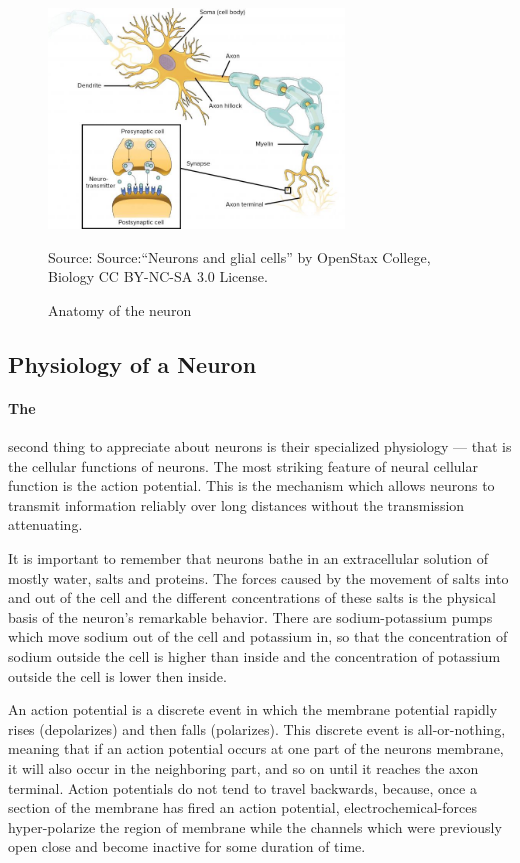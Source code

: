 \documentclass[paper=a4, fontsize=11pt]{scrartcl} %
\numberwithin{equation}{section} %
\numberwithin{figure}{section} %
\numberwithin{table}{section} %
\begin{document}
\begin{figure}[H]
    \centering
    \includegraphics[width=0.7\textwidth]{./data/neural.jpg}
    \caption{Anatomy of the neuron}
    \label{fig:my_picture}
    \vspace{1pt} %
    \small{Source: Source:“Neurons and glial cells” by OpenStax College, Biology CC BY-NC-SA 3.0 License.}
\end{figure}


\subsection{Physiology of a Neuron}
\paragraph{The}

 second thing to appreciate about neurons is their specialized physiology — that is the cellular functions of neurons. The most striking feature of neural cellular function is the action potential. This is the mechanism which allows neurons to transmit information reliably over long distances without the transmission attenuating.

\vspace{10pt}
It is important to remember that neurons bathe in an extracellular solution of mostly water, salts and proteins. The forces caused by the movement of salts into and out of the cell and the different concentrations of these salts is the physical basis of the neuron’s remarkable behavior. There are sodium-potassium pumps which move sodium out of the cell and potassium in, so that the concentration of sodium outside the cell is higher than inside and the concentration of potassium outside the cell is lower then inside.

\vspace{10pt}
An action potential is a discrete event in which the membrane potential rapidly rises (depolarizes) and then falls (polarizes). This discrete event is all-or-nothing, meaning that if an action potential occurs at one part of the neurons membrane, it will also occur in the neighboring part, and so on until it reaches the axon terminal. Action potentials do not tend to travel backwards, because, once a section of the membrane has fired an action potential, electrochemical-forces hyper-polarize the region of membrane while the channels which were previously open close and become inactive for some duration of time.
\end{document}
